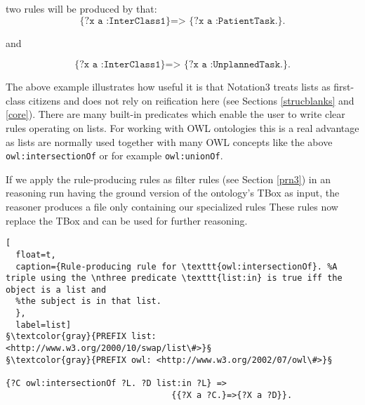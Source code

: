 \noindent two rules will be produced by that:  
\[\texttt{\{?x a :InterClass1\} => \{?x a :PatientTask.\}.}\]
\begin{center}
and
\end{center}
\[\texttt{\{?x a :InterClass1\} => \{?x a :UnplannedTask.\}.}\]

The above example illustrates how useful it is that Notation3 treats lists as first-class citizens and does not rely on reification here (see Sections \ref{strucblanks} and \ref{core}). 
There are many built-in predicates 
which enable the user to write 
clear rules operating on lists. For working with OWL ontologies this is a real advantage as lists are normally used
together with many OWL concepts 
like the above \texttt{owl:intersectionOf} or 
for example \texttt{owl:unionOf}.

If we apply the rule-producing rules as filter rules (see Section \ref{prn3}) in an \nthree reasoning run having the ground version of the ontology's TBox as input, the reasoner
produces a file only containing our specialized rules
% 
These rules now replace the TBox and can be used for further reasoning.


\begin{lstlisting}[
  float=t,
  caption={Rule-producing rule for \texttt{owl:intersectionOf}. %A triple using the \nthree predicate \texttt{list:in} is true iff the object is a list and 
  %the subject is in that list.  
  },
  label=list]
§\textcolor{gray}{PREFIX list: <http://www.w3.org/2000/10/swap/list\#>}§
§\textcolor{gray}{PREFIX owl: <http://www.w3.org/2002/07/owl\#>}§

{?C owl:intersectionOf ?L. ?D list:in ?L} => 
                                 {{?X a ?C.}=>{?X a ?D}}.
                              
\end{lstlisting}




